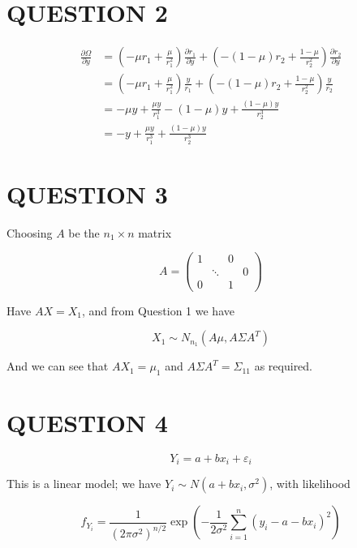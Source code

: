 \documentclass[a4paper]{article}
\begin{document}
\section{QUESTION 2}

\begin{align*}
\frac{\partial \Omega }{\partial y} & =  \left(  - \mu r_{1} + \frac{\mu}{r_{1}^{2}} \right) \frac{\partial r_{1} }{\partial y} + \left(  -(1-\mu)r_{2} + \frac{1 - \mu}{r_{2}^{2}} \right) \frac{\partial r_{2} }{\partial y}    \\
& =  \left(  - \mu r_{1} + \frac{\mu}{r_{1}^{2}} \right) \frac{y}{r_{1}} + \left(  -(1-\mu)r_{2} + \frac{1 - \mu}{r_{2}^{2}} \right) \frac{y}{r_{2}} \\
& = - \mu y + \frac{\mu y }{r_{1}^{3}} - (1-\mu)y + \frac{(1 - \mu)y}{r_{2}^{3}} \\
& = - y + \frac{\mu y }{r_{1}^{3}} + \frac{(1 - \mu)y}{r_{2}^{3}}
\end{align*}




\section{QUESTION 3}

Choosing $ A $ be the $ n_{1} \times n $ matrix 

\[ A = \begin{pmatrix}
1 & & 0 & \\
& \ddots & & 0 \\
0 & & 1 & 
\end{pmatrix} \]

Have $ A X = X_{1} $, and from Question 1 we have

\[ X_{1} \sim N_{n_{1}}( A \mu, A \Sigma A^{T})  \]

And we can see that $ A X_{1} = \mu_{1} $ and $ A \Sigma A^{T}  = \Sigma_{11} $ as required. 


\section{QUESTION 4}


\[ Y_{i} = a + b x_{i} + \varepsilon_{i} \]

This is a linear model; we have $ Y_{i} \sim N(a + bx_{i}, \sigma^{2}) $, with likelihood

\[ f_{Y_{i}} = \frac{1}{(2 \pi \sigma^{2})^{n /2}}  \exp \left(  - \frac{1}{2 \sigma^{2}} \sum_{i=1}^{n} ( y_{i} - a - bx_{i})^{2} \right)  \]
\end{document}
